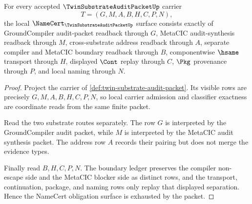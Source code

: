\begin{theorem}
\label{thm:twin-substrate-audit-packet-namecert}
For every accepted $\TwinSubstrateAuditPacketUp$ carrier
$$
T=(G,M,A,B,H,C,P,N),
$$
the local $\NameCert_{\TwinSubstrateAuditPacketUp}$ surface consists exactly of GroundCompiler audit-packet readback through $G$, MetaCIC audit-synthesis readback through $M$, cross-substrate address readback through $A$, separate compiler and MetaCIC boundary readback through $B$, componentwise $\hsame$ transport through $H$, displayed $\Cont$ replay through $C$, $\Pkg$ provenance through $P$, and local naming through $N$.
\end{theorem}
\begin{proof}
Project the carrier of \autoref{def:twin-substrate-audit-packet}. Its visible rows are precisely $G,M,A,B,H,C,P,N$, so local carrier admission and classifier exactness are coordinate reads from the same finite packet.

Read the two substrate routes separately. The row $G$ is interpreted by the GroundCompiler audit packet, while $M$ is interpreted by the MetaCIC audit synthesis packet. The address row $A$ records their pairing but does not merge the evidence types.

Finally read $B,H,C,P,N$. The boundary ledger preserves the compiler non-escape side and the MetaCIC blocker side as distinct rows, and the transport, continuation, package, and naming rows only replay that displayed separation. Hence the NameCert obligation surface is exhausted by the packet.
\end{proof}

